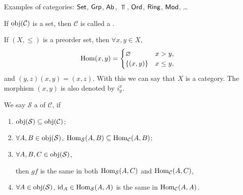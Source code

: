 \documentclass[openany, a5paper]{book}
\begin{document}
\begin{center}\end{center}

Examples of categories: $\operatorname{\mathsf{Set}}$, $\operatorname{\mathsf{Grp}}$, $\operatorname{\mathsf{Ab}}$, $\Top$, $\operatorname{\mathsf{Ord}}$, $\operatorname{\mathsf{Ring}}$, $\operatorname{\mathsf{Mod}}$, \ldots

If $\operatorname{obj}(\mathcal C)$ is a set, 
then $\mathcal C$ is called a .

If $(X, \leq)$ is a preorder set, then $\forall x, y \in X$, 
\begin{equation}
	\operatorname{Hom}(x, y) = 
	\begin{cases}
		\varnothing & x > y,
		\\
		\{(x, y)\} & x \leq y,
	\end{cases}
\end{equation}
and $(y, z) (x, y) = (x, z)$.
With this we can say that $X$ is a category.
The morphism $(x, y)$ is also denoted by $i^x_y$.

\begin{definition}[Subcategory]
	We say $\mathcal S$ a  of $\mathcal C$, if
	\begin{enumerate}[label=(\roman*)]
		\item $\operatorname{obj}(\mathcal S) \subseteq \operatorname{obj}(\mathcal C)$;
		\item $\forall A, B \in \operatorname{obj}(\mathcal S)$, $\operatorname{Hom}_{\mathcal S}(A, B) \subseteq \operatorname{Hom}_{\mathcal C}(A, B)$;
		\item $\forall A, B, C \in \operatorname{obj}(\mathcal S)$, 
		\begin{center}
		\end{center}
		then $gf$ is the same in both $\operatorname{Hom}_{\mathcal S}(A, C)$ and $\operatorname{Hom}_{\mathcal C}(A, C)$,
		\item $\forall A \in \operatorname{obj}(\mathcal S)$, 
		$\operatorname{id}_A \in \operatorname{Hom}_{\mathcal S}(A, A)$ is the same in $\operatorname{Hom}_{\mathcal C}(A, A)$.
	\end{enumerate}
\end{definition}
\end{document}
